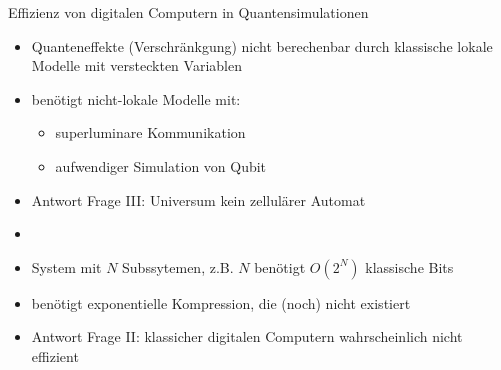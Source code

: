 \documentclass[aspectratio=1610, 9pt]{beamer}
\begin{document}
\begin{frame}{Effizienz von digitalen Computern in Quantensimulationen}
  \begin{itemize}
    \item Quanteneffekte (Verschränkgung) nicht berechenbar durch klassische lokale Modelle mit versteckten Variablen
    \item benötigt nicht-lokale Modelle mit:
    \begin{itemize}
      \item superluminare Kommunikation
      \item aufwendiger Simulation von Qubit
    \end{itemize}
    \item[\rightarrow] Antwort Frage III: Universum kein zellulärer Automat
    \item[]
    \item System mit $N$ Subssytemen, z.B. $N$ benötigt $O(2^N)$ klassische Bits
    \item benötigt exponentielle Kompression, die (noch) nicht existiert
    \item[\rightarrow] Antwort Frage II: klassicher digitalen Computern wahrscheinlich nicht effizient
  \end{itemize}

\end{frame}
\end{document}
